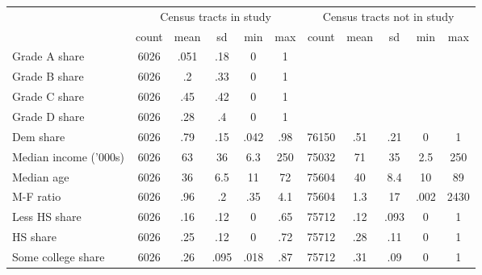 {
\def\sym#1{\ifmmode^{#1}\else\(^{#1}\)\fi}
\begin{tabular}{l*{2}{ccccc}}
\toprule
                    &\multicolumn{5}{c}{Census tracts in study}                      &\multicolumn{5}{c}{Census tracts not in study}                  \\
                    &       count&        mean&          sd&         min&         max&       count&        mean&          sd&         min&         max\\
\midrule
Grade A share       &        6026&        .051&         .18&           0&           1&            &            &            &            &            \\
Grade B share       &        6026&          .2&         .33&           0&           1&            &            &            &            &            \\
Grade C share       &        6026&         .45&         .42&           0&           1&            &            &            &            &            \\
Grade D share       &        6026&         .28&          .4&           0&           1&            &            &            &            &            \\
Dem share           &        6026&         .79&         .15&        .042&         .98&       76150&         .51&         .21&           0&           1\\
Median income ('000s)&        6026&          63&          36&         6.3&         250&       75032&          71&          35&         2.5&         250\\
Median age          &        6026&          36&         6.5&          11&          72&       75604&          40&         8.4&          10&          89\\
M-F ratio           &        6026&         .96&          .2&         .35&         4.1&       75604&         1.3&          17&        .002&        2430\\
Less HS share       &        6026&         .16&         .12&           0&         .65&       75712&         .12&        .093&           0&           1\\
HS share            &        6026&         .25&         .12&           0&         .72&       75712&         .28&         .11&           0&           1\\
Some college share  &        6026&         .26&        .095&        .018&         .87&       75712&         .31&         .09&           0&           1\\

\end{tabular}}

